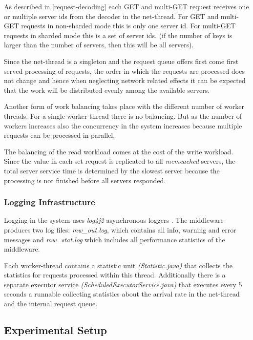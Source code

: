 \documentclass[report.tex]{subfiles}
\begin{document}
As described in \ref{request-decoding} each GET and multi-GET request receives one or multiple server ids from the decoder in the net-thread.
For GET and multi-GET requests in non-sharded mode this is only one server id. For multi-GET requests in sharded mode this is a set of server ids. (if the number of keys is larger than the number of servers, then this will be all servers).

Since the net-thread is a singleton and the request queue offers first come first served processing of requests, the order in which the requests are processed does not change and hence when neglecting network related effects it can be expected that the work will be distributed evenly among the available servers.

Another form of work balancing takes place with the different number of worker threads. For a single worker-thread there is no balancing. But as the number of workers increases also the concurrency in the system increases because multiple requests can be processed in parallel.

The balancing of the read workload comes at the cost of the write workload. Since the value in each set request is replicated to all \emph{memcached} servers, the total server service time is determined by the slowest server because the processing is not finished before all servers responded.


\subsubsection{Logging Infrastructure}

Logging in the system uses \emph{log4j2} asynchronous loggers \cite{log4j2}. The middleware produces two log files: \emph{mw\_out.log}, which contains all info, warning and error messages and \emph{mw\_stat.log} which includes all performance statistics of the middleware.

Each worker-thread contains a statistic unit \emph{(Statistic.java)} that collects the statistics for requests processed within this thread.
Additionally there is a separate executor service \emph{(ScheduledExecutorService.java)} that executes every 5 seconds a runnable collecting statistics about the arrival rate in the net-thread and the internal request queue. 

\subsection{Experimental Setup}
\end{document}
